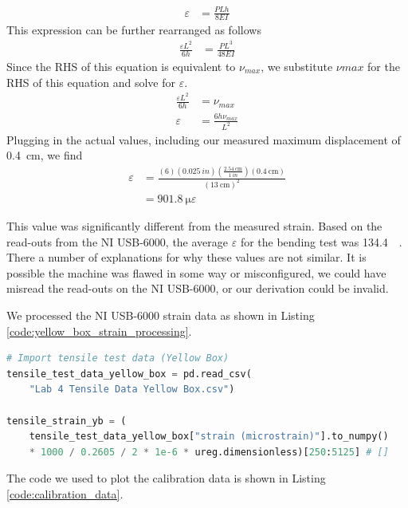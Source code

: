 \documentclass[12 pt]{report}
\begin{document}
\begin{parlist}
\begin{align*}
		\varepsilon&=\frac{PLh}{8EI}
	\end{align*}
	This expression can be further rearranged as follows
	\begin{align*}
		\frac{\varepsilon{}L^2}{6h}&=\frac{PL^3}{48EI}
	\end{align*}
	Since the RHS of this equation is equivalent to $\nu_{max}$, we substitute $\nu{max}$ for the RHS of this equation and solve for $\varepsilon$.
	\begin{align*}
		\frac{\varepsilon{}L^2}{6h}&=\nu_{max}\\
		\varepsilon&=\frac{6h\nu_{max}}{L^2}
	\end{align*}
	Plugging in the actual values, including our measured maximum displacement of \qty{0.4}{\cm}, we find
	\begin{align*}
		\varepsilon&=\frac{(6)(\qty{0.025}{in})(\frac{\qty{2.54}{\cm}}{\qty{1}{in}})(\qty{0.4}{\cm})}{(\qty{13}{\cm})^2}\\
		&=\qty{901.8}{\micro\varepsilon}
	\end{align*}
	
	This value was significantly different from the measured strain. Based on the read-outs from the NI USB-6000, the average $\varepsilon$ for the bending test was \qty{134.4}{\micro\varepsilon}. There a number of explanations for why these values are not similar. It is possible the machine was flawed in some way or misconfigured, we could have misread the read-outs on the NI USB-6000, or our derivation could be invalid.
	
	\item We processed the NI USB-6000 strain data as shown in Listing \ref{code:yellow_box_strain_processing}.
	
	\begin{lstlisting}[label={code:yellow_box_strain_processing}, caption={The code used to import the yellow box strain data and convert it to dimensionless strain.},language=Python]
# Import tensile test data (Yellow Box)
tensile_test_data_yellow_box = pd.read_csv(
    "Lab 4 Tensile Data Yellow Box.csv")

tensile_strain_yb = (
    tensile_test_data_yellow_box["strain (microstrain)"].to_numpy()
    * 1000 / 0.2605 / 2 * 1e-6 * ureg.dimensionless)[250:5125] # []\end{lstlisting}
	
	\item The code we used to plot the calibration data is shown in Listing \ref{code:calibration_data}.
	

\end{parlist}
\end{document}
